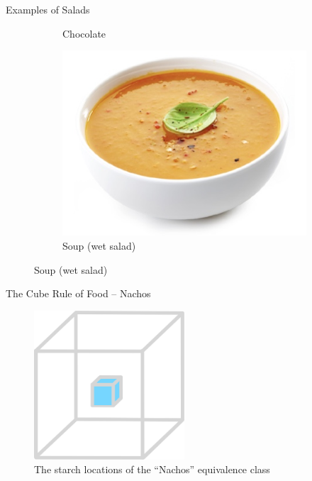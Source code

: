\documentclass{beamer}
\begin{document}
\begin{frame}{Examples of Salads}
\begin{figure}
\begin{subfigure}{.35\textwidth}
          \caption{\label{fig:chocolate}Chocolate}
        \end{subfigure}%
        \begin{subfigure}{.35\textwidth}
          \centering
          \includegraphics[width=.8\linewidth]{images/cube_rule_of_food/salad/31_soup.jpg}
          \caption{\label{fig:soup}Soup (wet salad)}
        \end{subfigure}
    \end{figure}
\end{frame}

\begin{frame}{The Cube Rule of Food -- Nachos}
    \begin{figure}
        \includegraphics[width=0.5\textwidth]{images/cube_rule_of_food/nachos/34_nachos.png}
        \caption{\label{fig:nachos-diagram}The starch locations of the ``Nachos'' equivalence class}
    \end{figure}
\end{frame}
\end{document}
